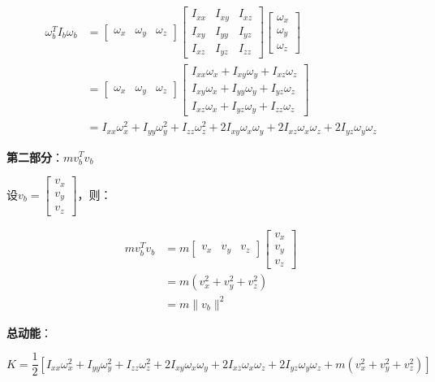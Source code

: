 \documentclass[12pt,a4paper]{article}
\begin{document}
\begin{align}
\omega_b^T I_b \omega_b &= \begin{bmatrix} \omega_x & \omega_y & \omega_z \end{bmatrix} \begin{bmatrix}
I_{xx} & I_{xy} & I_{xz} \\
I_{xy} & I_{yy} & I_{yz} \\
I_{xz} & I_{yz} & I_{zz}
\end{bmatrix} \begin{bmatrix} \omega_x \\ \omega_y \\ \omega_z \end{bmatrix} \\
&= \begin{bmatrix} \omega_x & \omega_y & \omega_z \end{bmatrix} \begin{bmatrix}
I_{xx}\omega_x + I_{xy}\omega_y + I_{xz}\omega_z \\
I_{xy}\omega_x + I_{yy}\omega_y + I_{yz}\omega_z \\
I_{xz}\omega_x + I_{yz}\omega_y + I_{zz}\omega_z
\end{bmatrix} \\
&= I_{xx}\omega_x^2 + I_{yy}\omega_y^2 + I_{zz}\omega_z^2 + 2I_{xy}\omega_x\omega_y + 2I_{xz}\omega_x\omega_z + 2I_{yz}\omega_y\omega_z
\end{align}

\textbf{第二部分}：$m v_b^T v_b$

设$v_b = \begin{bmatrix} v_x \\ v_y \\ v_z \end{bmatrix}$，则：

\begin{align}
m v_b^T v_b &= m \begin{bmatrix} v_x & v_y & v_z \end{bmatrix} \begin{bmatrix} v_x \\ v_y \\ v_z \end{bmatrix} \\
&= m(v_x^2 + v_y^2 + v_z^2) \\
&= m \|v_b\|^2
\end{align}

\textbf{总动能}：

\begin{equation}
K = \frac{1}{2}\left[I_{xx}\omega_x^2 + I_{yy}\omega_y^2 + I_{zz}\omega_z^2 + 2I_{xy}\omega_x\omega_y + 2I_{xz}\omega_x\omega_z + 2I_{yz}\omega_y\omega_z + m(v_x^2 + v_y^2 + v_z^2)\right]
\end{equation}
\end{document}
